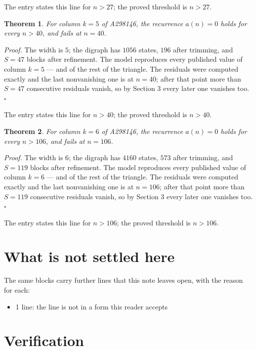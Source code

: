 \documentclass[11pt]{article}
\newtheorem{theorem}{Theorem}
\theoremstyle{definition}
\begin{document}
The entry states this line for $n > 27$; the proved threshold is $n > 27$.

\begin{theorem} For column $k = 5$ of A298146, the recurrence $a(n) = 0$ holds for every $n > 40$, and fails at $n = 40$.\end{theorem}

{\itshape Proof.} The width is $5$; the digraph has $1056$ states, $196$ after trimming, and $S = 47$ blocks after refinement. The model reproduces every published value of column $k = 5$ --- and of the rest of the triangle. The residuals were computed exactly and the last nonvanishing one is at $n = 40$; after that point more than $S = 47$ consecutive residuals vanish, so by Section 3 every later one vanishes too. $\square$

The entry states this line for $n > 40$; the proved threshold is $n > 40$.

\begin{theorem} For column $k = 6$ of A298146, the recurrence $a(n) = 0$ holds for every $n > 106$, and fails at $n = 106$.\end{theorem}

{\itshape Proof.} The width is $6$; the digraph has $4160$ states, $573$ after trimming, and $S = 119$ blocks after refinement. The model reproduces every published value of column $k = 6$ --- and of the rest of the triangle. The residuals were computed exactly and the last nonvanishing one is at $n = 106$; after that point more than $S = 119$ consecutive residuals vanish, so by Section 3 every later one vanishes too. $\square$

The entry states this line for $n > 106$; the proved threshold is $n > 106$.

\section{What is not settled here}

The same blocks carry further lines that this note leaves open, with the reason for each:

\begin{itemize}

\item 1 line: the line is not in a form this reader accepts

\end{itemize}

\section{Verification}
\end{document}
